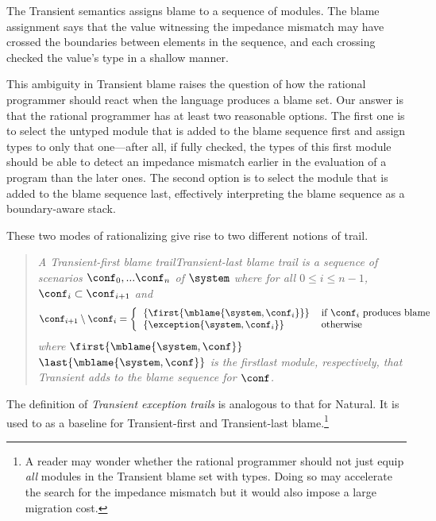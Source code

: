 
The Transient semantics assigns blame to a sequence of modules. The blame
assignment says that the value witnessing the impedance mismatch may have
crossed the boundaries between elements in the sequence, and each crossing
checked the value's type in a shallow manner.

This ambiguity in Transient blame raises the question of how the rational
programmer should react when the language produces a blame set. Our answer
is that the rational programmer has at least two reasonable options. The first
one is to select the untyped module that is added to the blame sequence first and
assign types to only that one---after all, if fully checked, the types of this
first module should be able to detect an impedance mismatch earlier in the
evaluation of a program than the later ones. The second option is to select the
module that is added to the blame sequence last, effectively interpreting the
blame sequence as a boundary-aware stack.

These two modes of rationalizing give rise to two different notions of trail.

\begin{quote}
\it A \emph{Transient-first blame trail}{\lrdef}\emph{Transient-last blame trail} is a sequence of scenarios
$\conf_0,...\conf_n$ of $\system$ where for all $0 \leq i \leq n - 1$,
$\conf_i \subset \conf_{i+1}$ and
\[ \conf_{i+1} \setminus \conf_i = %
\left\{ %
\begin{tabular}{ll} %
$\{\first{\mblame{\system, \conf_i}}\}$  & if $\conf_i$ produces blame \\ %
$\{\exception{\system, \conf_i}\}$     & otherwise \\ %
\end{tabular} \right. %
\]
where $\first{\mblame{\system, \conf}}${\lrdef}$\last{\mblame{\system, \conf}}$ is the
first{\lrdef}last module, respectively,  that Transient adds to the blame sequence for $\conf$.
\end{quote}

The definition of \emph{Transient exception trails} is analogous to that for
Natural. It is used to as a baseline for Transient-first and Transient-last
blame.\footnote{A reader may wonder whether the rational programmer
should not just equip {\em all\/} modules in the Transient blame set
with types. Doing so may accelerate the search for the impedance
mismatch but it would also impose a large migration cost.}
